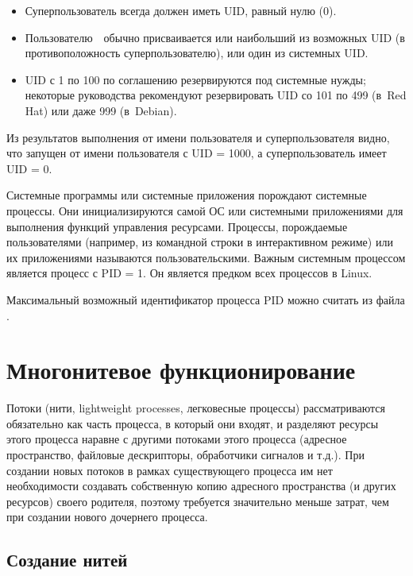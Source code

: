 \begin{itemize}
	\item Суперпользователь всегда должен иметь UID, равный нулю (0).
	\item Пользователю  обычно присваивается или наибольший из возможных UID (в противоположность суперпользователю), или один из системных UID.
	\item UID с 1 по 100 по соглашению резервируются под системные нужды; некоторые руководства рекомендуют резервировать UID со 101 по 499 (в Red Hat) или даже 999 (в Debian).
\end{itemize}



Из результатов выполнения  от имени пользователя и суперпользователя видно, что  запущен от имени пользователя с UID = 1000, а суперпользователь имеет UID = 0.

Системные программы или системные приложения порождают системные процессы. Они инициализируются самой ОС или системными приложениями для выполнения функций управления ресурсами. Процессы, порождаемые пользователями (например, из командной строки в интерактивном режиме) или их приложениями называются пользовательскими. Важным системным процессом является процесс  с PID = 1. Он является предком всех процессов в Linux.

Максимальный возможный идентификатор процесса PID можно считать из файла .


\section{Многонитевое функционирование}

Потоки (нити, lightweight processes, легковесные процессы) рассматриваются обязательно как часть процесса, в который они входят, и разделяют ресурсы этого процесса наравне с другими потоками этого процесса (адресное пространство, файловые дескрипторы, обработчики сигналов и т.д.). При создании новых потоков в рамках существующего процесса им нет необходимости создавать собственную копию адресного пространства (и других ресурсов) своего родителя, поэтому требуется значительно меньше затрат, чем при создании нового дочернего процесса.

\subsection{Создание нитей}

